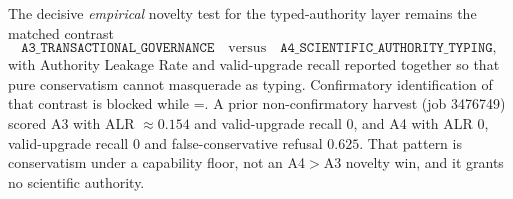 The decisive \emph{empirical} novelty test for the typed-authority layer remains the matched contrast
\[
\texttt{A3\_TRANSACTIONAL\_GOVERNANCE}
\quad\text{versus}\quad
\texttt{A4\_SCIENTIFIC\_AUTHORITY\_TYPING},
\]
with Authority Leakage Rate and valid-upgrade recall reported together so that pure conservatism cannot masquerade as typing. Confirmatory identification of that contrast is blocked while =. A prior non-confirmatory harvest (job 3476749) scored A3 with ALR $\approx 0.154$ and valid-upgrade recall $0$, and A4 with ALR $0$, valid-upgrade recall $0$ and false-conservative refusal $0.625$. That pattern is conservatism under a capability floor, not an A4$>$A3 novelty win, and it grants no scientific authority.
